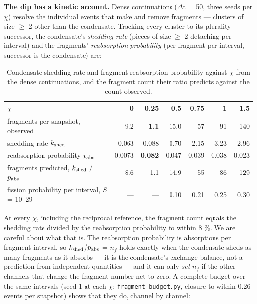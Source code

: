 \documentclass[aps,pre,preprint,superscriptaddress,nofootinbib,longbibliography]{revtex4-2}
\begin{document}
\textbf{The dip has a kinetic account.} Dense continuations ($\Delta$t = 50, three seeds per $\chi$) resolve the individual events that make and remove fragments --- clusters of size $\ge$ 2 other than the condensate. Tracking every cluster to its plurality successor, the condensate's \emph{shedding rate} (pieces of size $\ge$ 2 detaching per interval) and the fragments' \emph{reabsorption probability} (per fragment per interval, successor is the condensate) are:

\begin{table}[htbp]
\caption{Condensate shedding rate and fragment reabsorption probability against $\chi$ from the dense continuations, and the fragment count their ratio predicts against the count observed.}
\label{tab:4}
\begin{ruledtabular}
\begin{tabular}{lrrrrrr}
$\chi$ & 0 & 0.25 & 0.5 & 0.75 & 1 & 1.5 \\
\hline
fragments per snapshot, observed & 9.2 & \textbf{1.1} & 15.0 & 57 & 91 & 140 \\
shedding rate $k_{\rm shed}$ & 0.063 & 0.088 & 0.70 & 2.15 & 3.23 & 2.96 \\
reabsorption probability $p_{\rm abs}$ & 0.0073 & \textbf{0.082} & 0.047 & 0.039 & 0.038 & 0.023 \\
fragments predicted, $k_{\rm shed}$ / $p_{\rm abs}$ & 8.6 & 1.1 & 14.9 & 55 & 86 & 129 \\
fission probability per interval, $S$ = 10--29 & --- & --- & 0.10 & 0.21 & 0.25 & 0.30 \\
\end{tabular}
\end{ruledtabular}
\end{table}

At every $\chi$, including the reciprocal reference, the fragment count equals the shedding rate divided by the reabsorption probability to within 8 \%. We are careful about what that is. The reabsorption probability is absorptions per fragment-interval, so $k_{\rm shed}$/$p_{\rm abs}$ = $n_{f}$ holds exactly when the condensate sheds as many fragments as it absorbs --- it is the condensate's exchange balance, not a prediction from independent quantities --- and it can only \emph{set} $n_{f}$ if the other channels that change the fragment number net to zero. A complete budget over the same intervals (seed 1 at each $\chi$; \texttt{fragment\_budget.py}, closure to within 0.26 events per snapshot) shows that they do, channel by channel:
\end{document}
